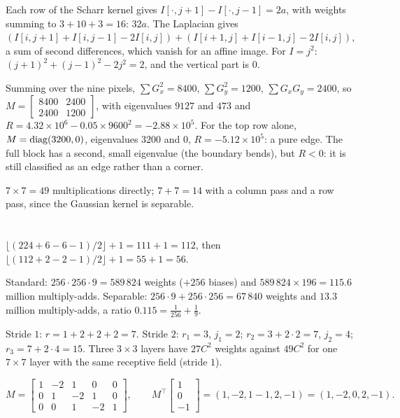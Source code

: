 Each row of the Scharr kernel gives $I[\cdot, j + 1] - I[\cdot, j - 1] = 2a$, with weights summing to $3 + 10 + 3 = 16$: $32a$. The
Laplacian gives $(I[i,j + 1] + I[i,j - 1] - 2I[i,j]) + (I[i + 1,j] + I[i - 1,j] - 2I[i,j])$, a sum of second differences, which vanish
for an affine image. For $I = j^2$: $(j + 1)^2 + (j - 1)^2 - 2j^2 = 2$, and the vertical part is $0$.

Summing over the nine pixels, $\sum G_x^2 = 8400$, $\sum G_y^2 = 1200$, $\sum G_xG_y = 2400$, so $M = \begin{bmatrix}8400 & 2400\\2400 & 1200\end{bmatrix}$, with
eigenvalues $9127$ and $473$ and $R = 4.32\times10^6 - 0.05\times9600^2 = -2.88\times10^5$. For the top row alone, $M = \operatorname{diag}(3200, 0)$, eigenvalues
$3200$ and $0$, $R = -5.12\times10^5$: a pure edge. The full block has a second, small eigenvalue (the boundary
bends), but $R<0$: it is still classified as an edge rather than a corner.

$7\times7 = 49$ multiplications directly; $7 + 7 = 14$ with a column pass and a row pass, since the Gaussian kernel is
separable.

\section{}

$\lfloor(224 + 6 - 6 - 1)/2\rfloor + 1 = 111 + 1 = 112$, then $\lfloor(112 + 2 - 2 - 1)/2\rfloor + 1 = 55 + 1 = 56$.

Standard: $256\cdot256\cdot9 = 589\,824$ weights ($+256$ biases) and $589\,824\times196 = 115.6$ million multiply-adds. Separable:
$256\cdot9 + 256\cdot256 = 67\,840$ weights and $13.3$ million multiply-adds, a ratio $0.115 = \frac1{256} + \frac19$.

Stride $1$: $r = 1 + 2 + 2 + 2 = 7$. Stride $2$: $r_1 = 3$, $j_1 = 2$; $r_2 = 3 + 2\cdot2 = 7$, $j_2 = 4$; $r_3 = 7 + 2\cdot4 = 15$. Three $3\times3$ layers have $27C^2$
weights against $49C^2$ for one $7\times7$ layer with the same receptive field (stride $1$).

\[
  M = \begin{bmatrix}1 & -2 & 1 & 0 & 0\\0 & 1 & -2 & 1 & 0\\0 & 0 & 1 & -2 & 1\end{bmatrix},\qquad
  M^\top\begin{bmatrix}1\\0\\-1\end{bmatrix} = (1, -2, 1 - 1, 2, -1) = (1, -2, 0, 2, -1) .
\]

